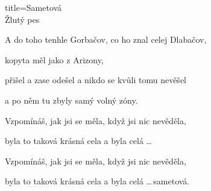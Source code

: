 \begin{song}{title=\centering Sametová \\\normalsize Žlutý pes  \vspace*{-0.3cm}}
{\sloka
	A do toho tenhle Gorbačov, co ho znal celej Dlabačov,
	
	kopyta měl jako z Arizony,
	
	přišel a zase odešel a nikdo se kvůli tomu nevěšel
	
	a po něm tu zbyly samý volný zóny.

	Vzpomínáš, jak jsi se měla, když jsi nic nevěděla,
	
	byla to taková krásná cela a byla celá \dots
	 
	Vzpomínáš, jak jsi se měla, když jsi nic nevěděla,
	
	byla to taková krásná cela a byla celá \dots \,sametová.

}
\setcounter{Slokočet}{0}
\end{song}


